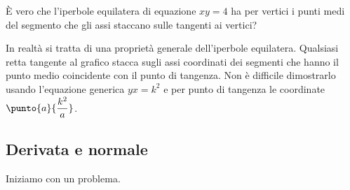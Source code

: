 \begin{esempio}
È vero che l'iperbole equilatera di equazione \(xy = 4\) ha per vertici i 
punti medi del segmento che gli assi staccano sulle tangenti ai vertici? 


\begin{osservazione}
In realtà si tratta di una proprietà generale dell'iperbole equilatera.
Qualsiasi retta tangente al grafico stacca sugli assi coordinati dei 
segmenti che hanno il punto medio coincidente con il punto di tangenza. 
Non è difficile dimostrarlo usando l'equazione generica \(yx=k^2\) e per 
punto di tangenza le coordinate \(\punto{a}{\dfrac{k^2}{a}}\).
\end{osservazione}
\end{esempio}

\subsection{Derivata e normale}
\label{subsec:differenziazione_normale}

Iniziamo con un problema.

